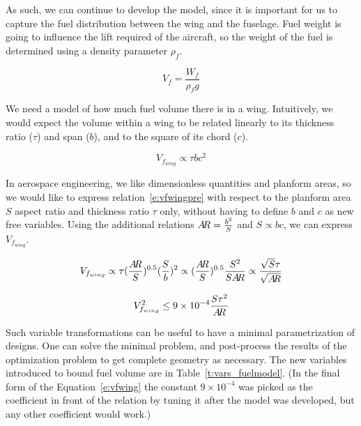 As such, we can continue to develop the model, since it is important for us to
capture the fuel distribution between the wing and the fuselage. Fuel weight is going
to influence the lift required of the aircraft, so the weight of the fuel is determined
using a density parameter $\rho_{f}$. 

\begin{equation}
    V_f = \frac{W_f } {\rho_f g}
    \label{e:vf}
\end{equation}

We need a model of how much fuel volume there is in a wing. Intuitively,
we would expect the volume within a wing
to be related linearly to its thickness ratio ($\tau$) and span ($b$),
and to the square of its chord ($c$). 

\begin{equation}
	V_{f_{wing}} \propto \tau b c^2
	\label{e:vfwingpre}
\end{equation} 

In aerospace engineering, we like dimensionless quantities and planform areas, 
so we would like to express relation~\ref{e:vfwingpre} with respect to the planform area $S$
aspect ratio \AR and thickness ratio $\tau$ only, without having to define $b$ and $c$ as new
free variables.
Using the additional relations $A\hspace{-2.0pt}R = \frac{b^2}{S}$ and $S \propto b c$, we can
express $V_{f_{wing}}$.

\begin{equation}
	V_{f_{wing}} \propto \tau (\frac{A\hspace{-2.0pt}R}{S})^{0.5} (\frac{S}{b})^2 \propto
		(\frac{A\hspace{-2.0pt}R}{S})^{0.5} \frac{S^2}{S A\hspace{-2.0pt}R} \propto \frac{\sqrt{S}\tau}{\sqrt{A\hspace{-2.0pt}R}}
\end{equation}

\begin{equation}
\label{e:vfwing}
V_{f_{wing}}^2 \leq 9\times10^{-4} \frac{S \tau^2}{A\hspace{-2.0pt}R}
\end{equation}

Such variable transformations can be useful to have a minimal parametrization of designs.
One can solve the minimal problem, and
post-process the results of the optimization problem to get complete geometry
as necessary. The new variables introduced to bound fuel volume are in Table~\ref{t:vars_fuelmodel}.
(In the final form of the Equation~\ref{e:vfwing} the constant $9\times10^{-4}$ was picked as the coefficient in
front of the relation by tuning it after the model was developed,
but any other coefficient would work.)

